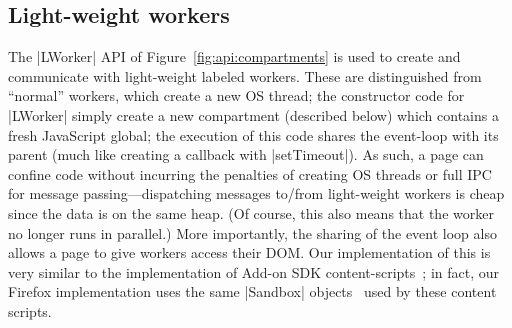 \subsection{Light-weight workers}
%
The \js|LWorker| API of Figure~\ref{fig:api:compartments} is used to
create and communicate with light-weight labeled workers.
%
These are distinguished from ``normal'' workers, which create a new OS thread; the
constructor code for \js|LWorker| simply create a new compartment
(described below) which contains a fresh JavaScript global; the
execution of this code shares the event-loop with its parent (much
like creating a callback with \js|setTimeout|).
%
As such, a page can confine code without incurring the
penalties of creating OS threads or full IPC for message
passing---dispatching messages to/from light-weight workers is cheap
since the data is on the same heap.
%
(Of course, this also means that the worker no longer runs in parallel.)
%
More importantly, the sharing of the event loop also allows a page to
give workers access their DOM\@.
%
Our implementation of this is very similar to the implementation of
Add-on SDK content-scripts~\cite{addon-sdk}; in fact, our Firefox
implementation uses the same \js|Sandbox| objects~\cite{mdn-sandbox}
used by these content scripts.
 

